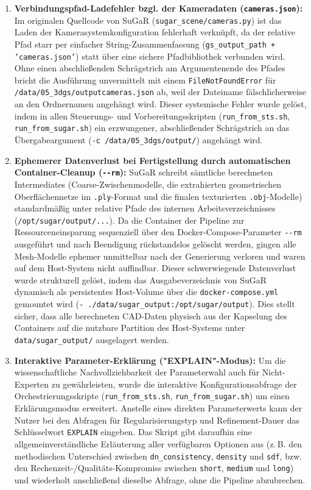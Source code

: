 \documentclass[12pt,a4paper]{article}
\begin{document}
\begin{enumerate}[noitemsep]
    \item \textbf{Verbindungspfad-Ladefehler bzgl. der Kameradaten (\texttt{cameras.json}):} Im originalen Quellcode von SuGaR (\texttt{sugar\_scene/cameras.py}) ist das Laden der Kamerasystemkonfiguration fehlerhaft verknüpft, da der relative Pfad starr per einfacher String-Zusammenfassung (\texttt{gs\_output\_path + 'cameras.json'}) statt über eine sichere Pfadbibliothek verbunden wird. Ohne einen abschließenden Schrägstrich am Argumentenende des Pfades bricht die Ausführung unvermittelt mit einem \texttt{FileNotFoundError} für \texttt{/data/05\_3dgs/outputcameras.json} ab, weil der Dateiname fälschlicherweise an den Ordnernamen angehängt wird. Dieser systemische Fehler wurde gelöst, indem in allen Steuerungs- und Vorbereitungsskripten (\texttt{run\_from\_sts.sh}, \texttt{run\_from\_sugar.sh}) ein erzwungener, abschließender Schrägstrich an das Übergabeargument (\texttt{-c /data/05\_3dgs/output/}) angehängt wird.
    \item \textbf{Ephemerer Datenverlust bei Fertigstellung durch automatischen Container-Cleanup (\texttt{-{}-rm}):} SuGaR schreibt sämtliche berechneten Intermediates (Coarse-Zwischenmodelle, die extrahierten geometrischen Oberflächennetze im \texttt{.ply}-Format und die finalen texturierten \texttt{.obj}-Modelle) standardmäßig unter relative Pfade des internen Arbeitsverzeichnisses (\texttt{/opt/sugar/output/...}). Da die Container der Pipeline zur Ressourceneinsparung sequenziell über den Docker-Compose-Parameter \texttt{-{}-rm} ausgeführt und nach Beendigung rückstandslos gelöscht werden, gingen alle Mesh-Modelle ephemer unmittelbar nach der Generierung verloren und waren auf dem Host-System nicht auffindbar. Dieser schwerwiegende Datenverlust wurde strukturell gelöst, indem das Ausgabeverzeichnis von SuGaR dynamisch als persistentes Host-Volume über die \texttt{docker-compose.yml} gemountet wird (\texttt{- ./data/sugar\_output:/opt/sugar/output}). Dies stellt sicher, dass alle berechneten CAD-Daten physisch aus der Kapselung des Containers auf die nutzbare Partition des Host-Systems unter \texttt{data/sugar\_output/} ausgelagert werden.
    \item \textbf{Interaktive Parameter-Erklärung ("EXPLAIN"-Modus):} Um die wissenschaftliche Nachvollziehbarkeit der Parameterwahl auch für Nicht-Experten zu gewährleisten, wurde die interaktive Konfigurationsabfrage der Orchestrierungsskripte (\texttt{run\_from\_sts.sh}, \texttt{run\_from\_sugar.sh}) um einen Erklärungsmodus erweitert. Anstelle eines direkten Parameterwerts kann der Nutzer bei den Abfragen für Regularisierungstyp und Refinement-Dauer das Schlüsselwort \texttt{EXPLAIN} eingeben. Das Skript gibt daraufhin eine allgemeinverständliche Erläuterung aller verfügbaren Optionen aus (z.\,B. den methodischen Unterschied zwischen \texttt{dn\_consistency}, \texttt{density} und \texttt{sdf}, bzw. den Rechenzeit-/Qualitäts-Kompromiss zwischen \texttt{short}, \texttt{medium} und \texttt{long}) und wiederholt anschließend dieselbe Abfrage, ohne die Pipeline abzubrechen.

\end{enumerate}
\end{document}
